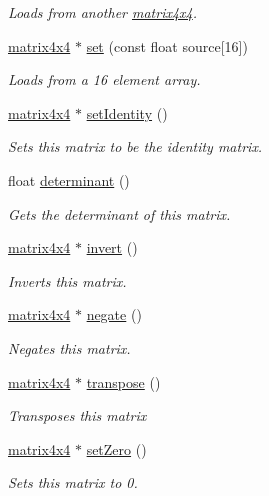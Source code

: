 \begin{DoxyCompactItemize}
\begin{DoxyCompactList}\small\item\em Loads from another \hyperlink{classflounder_1_1matrix4x4}{matrix4x4}. \end{DoxyCompactList}\item 
\hyperlink{classflounder_1_1matrix4x4}{matrix4x4} $\ast$ \hyperlink{classflounder_1_1matrix4x4_a891d47fa2cff36634136c06f6ac24713}{set} (const float source\mbox{[}16\mbox{]})
\begin{DoxyCompactList}\small\item\em Loads from a 16 element array. \end{DoxyCompactList}\item 
\hyperlink{classflounder_1_1matrix4x4}{matrix4x4} $\ast$ \hyperlink{classflounder_1_1matrix4x4_a973b7975291890e5697255c95f4a252f}{set\+Identity} ()
\begin{DoxyCompactList}\small\item\em Sets this matrix to be the identity matrix. \end{DoxyCompactList}\item 
float \hyperlink{classflounder_1_1matrix4x4_a84057c3c850597e4c51882f79773a7fd}{determinant} ()
\begin{DoxyCompactList}\small\item\em Gets the determinant of this matrix. \end{DoxyCompactList}\item 
\hyperlink{classflounder_1_1matrix4x4}{matrix4x4} $\ast$ \hyperlink{classflounder_1_1matrix4x4_ad8959f0c459bb67eb884806f7303c468}{invert} ()
\begin{DoxyCompactList}\small\item\em Inverts this matrix. \end{DoxyCompactList}\item 
\hyperlink{classflounder_1_1matrix4x4}{matrix4x4} $\ast$ \hyperlink{classflounder_1_1matrix4x4_a2bf90fdac8bc2f7efe6b03f252ebfeba}{negate} ()
\begin{DoxyCompactList}\small\item\em Negates this matrix. \end{DoxyCompactList}\item 
\hyperlink{classflounder_1_1matrix4x4}{matrix4x4} $\ast$ \hyperlink{classflounder_1_1matrix4x4_aaf0d086f1d886d8aedd61c070f098344}{transpose} ()
\begin{DoxyCompactList}\small\item\em Transposes this matrix \end{DoxyCompactList}\item 
\hyperlink{classflounder_1_1matrix4x4}{matrix4x4} $\ast$ \hyperlink{classflounder_1_1matrix4x4_a3fd10ae3589d6ec447cc50f032cfc2f7}{set\+Zero} ()
\begin{DoxyCompactList}\small\item\em Sets this matrix to 0. \end{DoxyCompactList}\end{DoxyCompactItemize}
